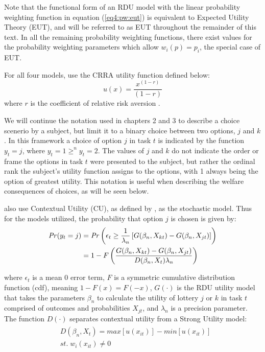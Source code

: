 \documentclass[../main.tex]{subfiles}
\begin{document}
Note that the functional form of an RDU model with the linear probability weighting function in equation (\ref{eq4:pw:eut}) is equivalent to Expected Utility Theory (EUT), and will be referred to as EUT throughout the remainder of this text.
In all the remaining probability weighting functions, there exist values for the probability weighting parameters which allow $w_i(p) = p_i$, the special case of EUT.

For all four models, \textcite{Harrison2016} use the CRRA utility function defined below:
\begin{equation}
	\label{eq4:CRRA}
	u(x) = \frac{x^{(1-r)}}{(1-r)}
\end{equation}
\noindent where $r$ is the coefficient of relative risk aversion \parencite{Pratt1964}.

We will continue the notation used in chapters 2 and 3 to describe a choice scenerio by a subject, but limit it to a binary choice between two options, $j$ and $k$.
In this framework a choice of option $j$ in task $t$ is indicated by the function $y_t = j$, where $y_t = 1 \geq^n y_t = 2$.
The values of $j$ and $k$ do not indicate the order or frame the options in task $t$ were presented to the subject, but rather the ordinal rank the subject's utility function assigns to the options, with 1 always being the option of greatest utility.
This notation is useful when describing the welfare consequences of choices, as will be seen below.

\textcite{Harrison2016} also use Contextual Utility (CU), as defined by \textcite{Wilcox2008}, as the stochastic model.
Thus for the models utilized, the probability that option $j$ is chosen is given by:
\begin{align}
	\label{eq4:RE.2}
	\begin{split}
		{\ensuremath{\mathit{Pr}}}(y_t = j) &= {\mathit{Pr}}\left(  \epsilon_t \geq \frac{1}{\lambda_n} \left[ G(\beta_n,X_{kt}) - G(\beta_n,X_{jt}) \right] \right)\\
		&= 1 - F\left( \dfrac{G(\beta_n,X_{kt}) - G(\beta_n,X_{jt})}{D(\beta_n,X_t)\lambda_n }  \right)
	\end{split}
\end{align}

\noindent where $\epsilon_t$ is a mean 0 error term, $F$ is a symmetric cumulative distribution function (cdf), meaning $1 - F(x)  = F(-x)$, $G(\cdot)$ is the RDU utility model that takes the parameters $\beta_n$ to calculate the utility of lottery $j$ or $k$ in task $t$ comprised of outcomes and probabilities $X_{jt}$, and $\lambda_n$ is a precision parameter.
The function $D(\cdot)$ separates contextual utility from a Strong Utility model:
\begin{align}
	\label{eq4:W.cu}
	\begin{split}
		&D(\beta_n,X_t) = \mathit{max}[u(x_{it})] - \mathit{min}[u(x_{it})]\\
		&\mathit{st.}\; w_i(x_{it}) \neq 0
	\end{split}
\end{align}
\end{document}
